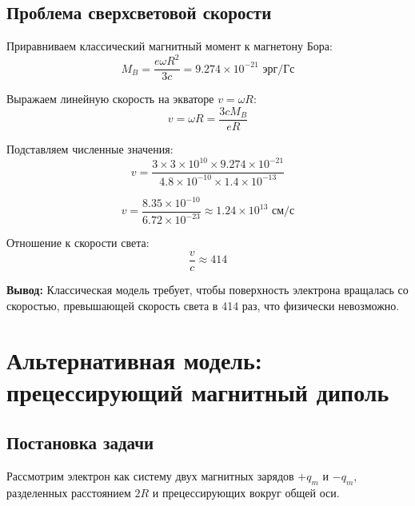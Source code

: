 \documentclass[12pt,a4paper]{article}
\begin{document}
\subsection{Проблема сверхсветовой скорости}

Приравниваем классический магнитный момент к магнетону Бора:
\begin{equation}
M_B = \frac{e\omega R^2}{3c} = 9.274 \times 10^{-21} \text{ эрг/Гс}
\end{equation}

Выражаем линейную скорость на экваторе $v = \omega R$:
\begin{equation}
v = \omega R = \frac{3c M_B}{e R}
\end{equation}

Подставляем численные значения:
\begin{equation}
v = \frac{3 \times 3 \times 10^{10} \times 9.274 \times 10^{-21}}{4.8 \times 10^{-10} \times 1.4 \times 10^{-13}}
\end{equation}

\begin{equation}
v = \frac{8.35 \times 10^{-10}}{6.72 \times 10^{-23}} \approx 1.24 \times 10^{13} \text{ см/с}
\end{equation}

Отношение к скорости света:
\begin{equation}
\boxed{\frac{v}{c} \approx 414}
\end{equation}

\textbf{Вывод:} Классическая модель требует, чтобы поверхность электрона вращалась со скоростью, превышающей скорость света в 414 раз, что физически невозможно.

\section{Альтернативная модель: прецессирующий магнитный диполь}

\subsection{Постановка задачи}

Рассмотрим электрон как систему двух магнитных зарядов $+q_m$ и $-q_m$, разделенных расстоянием $2R$ и прецессирующих вокруг общей оси.
\end{document}
